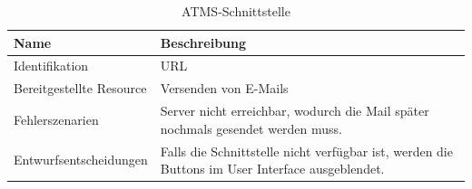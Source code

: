 \begin{table}[H]
	\centering
	\caption{ATMS-Schnittstelle}
	\begin{tabular}{ | p{4cm} | p{11cm} | }
		\toprule
		{\textbf{Name}} & {\textbf{Beschreibung}} \\
		\midrule
		Identifikation & URL\\ \hline
		Bereitgestellte Resource & Versenden von E-Mails\\ \hline
		Fehlerszenarien & Server nicht erreichbar, wodurch die Mail später nochmals gesendet werden muss.\\ \hline
		Entwurfsentscheidungen & Falls die Schnittstelle nicht verfügbar ist, werden die Buttons im User Interface ausgeblendet.\\
		\bottomrule
	\end{tabular}
\end{table}
